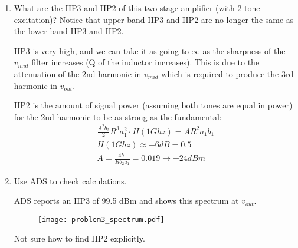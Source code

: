 \begin{enumerate}[label=(\alph*)]
    \item {\color{blue} What are the IIP3 and IIP2 of this two-stage amplifier (with 2 tone excitation)?
        Notice that upper-band IIP3 and IIP2 are no longer the same as the lower-band IIP3 and IIP2.}

    IIP3 is very high, and we can take it as going to $\infty$ as the sharpness of the $v_{mid}$ filter increases (Q of the inductor increases).
        This is due to the attenuation of the 2nd harmonic in $v_{mid}$ which is required to produce the 3rd harmonic in $v_{out}$.

    IIP2 is the amount of signal power (assuming both tones are equal in power) for the 2nd harmonic to be as strong as the fundamental:
    \begin{align*}
        \frac{A^2 b_2}{2} R^3 a_1^2 \cdot H(1Ghz) = A R^2 a_1 b_1 \\
        H(1Ghz) \approx -6 dB = 0.5 \\
        A = \frac{4 b_1}{R b_2 a_1} = 0.019 \rightarrow -24 dBm
    \end{align*}

    \item {\color{blue} Use ADS to check calculations.}

    ADS reports an IIP3 of 99.5 dBm and shows this spectrum at $v_{out}$.
    \begin{figure}[H]
        \centering \texttt{[image: problem3\_spectrum.pdf]}
    \end{figure}

    Not sure how to find IIP2 explicitly.
\end{enumerate}


